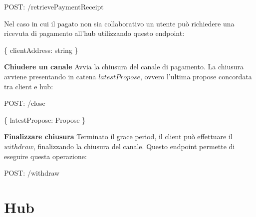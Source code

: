 \documentclass[12pt,italian,]{book}
\newenvironment{Shaded}{}{}
\newcommand{\DataTypeTok}[1]{\textcolor[rgb]{0.56,0.13,0.00}{#1}}
\newcommand{\NormalTok}[1]{#1}
\newcommand{\OperatorTok}[1]{\textcolor[rgb]{0.40,0.40,0.40}{#1}}
\newcommand{\SpecialStringTok}[1]{\textcolor[rgb]{0.73,0.40,0.53}{#1}}
\begin{document}
\begin{Shaded}
\begin{Highlighting}[]
\NormalTok{POST}\OperatorTok{:} \SpecialStringTok{/retrievePaymentReceipt}
\end{Highlighting}
\end{Shaded}

Nel caso in cui il pagato non sia collaborativo un utente può richiedere una ricevuta di pagamento all'hub utilizzando questo endpoint:

\begin{Shaded}
\begin{Highlighting}[]
\OperatorTok{\{}
    \DataTypeTok{clientAddress}\OperatorTok{:}\NormalTok{ string}
\OperatorTok{\}}
\end{Highlighting}
\end{Shaded}

\textbf{\textbf{Chiudere un canale}} Avvia la chiusura del canale di pagamento. La chiusura avviene presentando in catena \(latestPropose\), ovvero l'ultima propose concordata tra client e hub:

\begin{Shaded}
\begin{Highlighting}[]
\NormalTok{POST}\OperatorTok{:} \SpecialStringTok{/close}
\end{Highlighting}
\end{Shaded}

\begin{Shaded}
\begin{Highlighting}[]
\OperatorTok{\{}
    \DataTypeTok{latestPropose}\OperatorTok{:}\NormalTok{ Propose}
\OperatorTok{\}}
\end{Highlighting}
\end{Shaded}

\textbf{\textbf{Finalizzare chiusura}} Terminato il grace period, il client può effettuare il \(withdraw\), finalizzando la chiusura del canale. Questo endpoint permette di eseguire questa operazione:

\begin{Shaded}
\begin{Highlighting}[]
\NormalTok{POST}\OperatorTok{:} \SpecialStringTok{/withdraw}
\end{Highlighting}
\end{Shaded}

\hypertarget{hub}{%
\section{Hub}\label{hub}}
\end{document}
